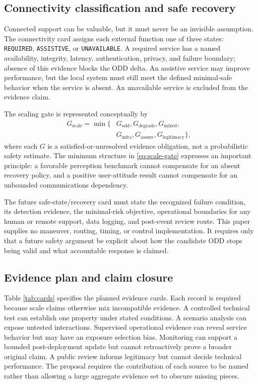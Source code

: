\documentclass[conference]{../../../../Conference-LaTeX-template_10-17-19/IEEEtran}
\begin{document}
\subsection{Connectivity classification and safe recovery}
Connected support can be valuable, but it must never be an invisible assumption. The connectivity card assigns each external function one of three states: \texttt{REQUIRED}, \texttt{ASSISTIVE}, or \texttt{UNAVAILABLE}. A required service has a named availability, integrity, latency, authentication, privacy, and failure boundary; absence of this evidence blocks the ODD delta. An assistive service may improve performance, but the local system must still meet the defined minimal-safe behavior when the service is absent. An unavailable service is excluded from the evidence claim.

The scaling gate is represented conceptually by
\begin{align}
G_{\mathrm{scale}}=\min\big\{&G_{\mathrm{odd}},G_{\mathrm{degrade}},G_{\mathrm{mixed}},\nonumber\\
&G_{\mathrm{infra}},G_{\mathrm{assure}},G_{\mathrm{legitimacy}}\big\},
\label{eq:scale-gate}
\end{align}
where each $G$ is a satisfied-or-unresolved evidence obligation, not a probabilistic safety estimate. The minimum structure in \eqref{eq:scale-gate} expresses an important principle: a favorable perception benchmark cannot compensate for an absent recovery policy, and a positive user-attitude result cannot compensate for an unbounded communications dependency.

The future safe-state/recovery card must state the recognized failure condition, its detection evidence, the minimal-risk objective, operational boundaries for any human or remote support, data logging, and post-event review route. This paper supplies no maneuver, routing, timing, or control implementation. It requires only that a future safety argument be explicit about how the candidate ODD stops being valid and what accountable response is claimed.

\subsection{Evidence plan and claim closure}
Table \ref{tab:cards} specifies the planned evidence cards. Each record is required because scale claims otherwise mix incompatible evidence. A controlled technical test can establish one property under stated conditions. A scenario analysis can expose untested interactions. Supervised operational evidence can reveal service behavior but may have an exposure selection bias. Monitoring can support a bounded post-deployment update but cannot retroactively prove a broader original claim. A public review informs legitimacy but cannot decide technical performance. The proposal requires the contribution of each source to be named rather than allowing a large aggregate evidence set to obscure missing pieces.
\end{document}
